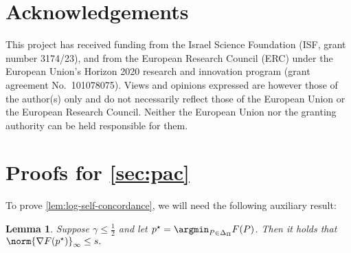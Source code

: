 \documentclass[11pt]{article}
\renewcommand{\ind}[1]{\mathds{1}\{#1\}}
\newcommand{\bbE}{\boldsymbol{\mathbb{E}}}
\renewcommand{\E}{\bbE}
\newcommand{\yprobg}[3]{Q^\gamma_{#2,#3}(#1)}
\newcommand{\lab}{y}
\newcommand{\calY}{\mathcal{Y}}
\newcommand{\calD}{\mathcal{D}}
\newcommand{\obj}{F}
\theoremstyle{plain}
\newtheorem{lemma}{Lemma}
\begin{document}
\section*{Acknowledgements}
This project has received funding from the Israel Science Foundation (ISF, grant number 3174/23), and from the European Research Council (ERC) under the European Union’s Horizon 2020 research and innovation program (grant agreement No.\ 101078075). Views and opinions expressed are however those of the author(s) only and do not necessarily reflect those of the European Union or the European Research Council. Neither the European Union nor the granting authority can be held responsible for them.





\newpage
\appendix


\section[Proofs for Section 3]{Proofs for \cref{sec:pac}}
\label{sec:pac-proofs}

To prove \cref{lem:log-self-concordance}, we will need the following auxiliary result:



\begin{lemma}
    \label{lem:bounded-grad}
    Suppose $\gamma \leq \frac12$ and let $p^\star = \argmin_{P \in \Delta_\Pi} \obj(P)$. 
    Then it holds that
    $
        \norm{\nabla \obj(p^\star)}_\infty \leq s.
    $
\end{lemma}
\end{document}
